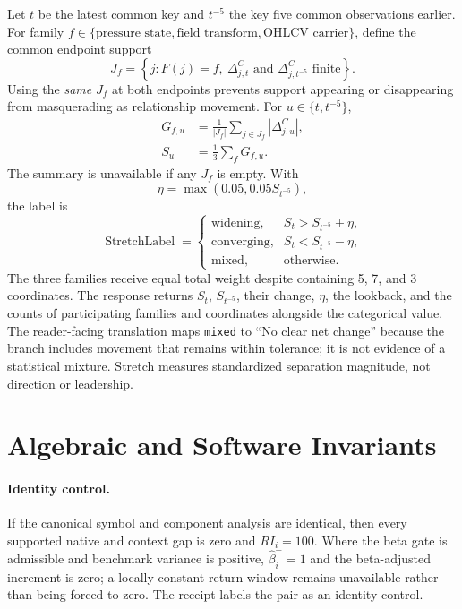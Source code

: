 \documentclass{article}
\begin{document}
Let $t$ be the latest common key and $t^{-5}$ the key five common observations earlier. For family $f\in\{\text{pressure state},\text{field transform},\text{OHLCV carrier}\}$, define the common endpoint support
\begin{equation}
J_f=\left\{j:F(j)=f,\
\Delta^C_{j,t}\text{ and }\Delta^C_{j,t^{-5}}\text{ finite}\right\}.
\label{eq:stretch-support}
\end{equation}
Using the \emph{same} $J_f$ at both endpoints prevents support appearing or disappearing from masquerading as relationship movement. For $u\in\{t,t^{-5}\}$,
\begin{align}
G_{f,u}&=\frac{1}{|J_f|}
\sum_{j\in J_f}|\Delta^C_{j,u}|,\\
S_u&=\frac{1}{3}\sum_fG_{f,u}.
\label{eq:stretch}
\end{align}
The summary is unavailable if any $J_f$ is empty. With
\begin{equation}
\eta=\max(0.05,0.05S_{t^{-5}}),
\end{equation}
the label is
\begin{equation}
\operatorname{StretchLabel}=
\begin{cases}
\text{widening}, & S_t>S_{t^{-5}}+\eta,\\
\text{converging}, & S_t<S_{t^{-5}}-\eta,\\
\text{mixed}, & \text{otherwise}.
\end{cases}
\label{eq:stretch-label}
\end{equation}
The three families receive equal total weight despite containing 5, 7, and 3 coordinates. The response returns $S_t$, $S_{t^{-5}}$, their change, $\eta$, the lookback, and the counts of participating families and coordinates alongside the categorical value. The reader-facing translation maps \texttt{mixed} to ``No clear net change'' because the branch includes movement that remains within tolerance; it is not evidence of a statistical mixture. Stretch measures standardized separation magnitude, not direction or leadership.

\section{Algebraic and Software Invariants}

\paragraph{Identity control.}
If the canonical symbol and component analysis are identical, then every supported native and context gap is zero and $RI_i=100$. Where the beta gate is admissible and benchmark variance is positive, $\widehat\beta^-_i=1$ and the beta-adjusted increment is zero; a locally constant return window remains unavailable rather than being forced to zero. The receipt labels the pair as an identity control.
\end{document}
